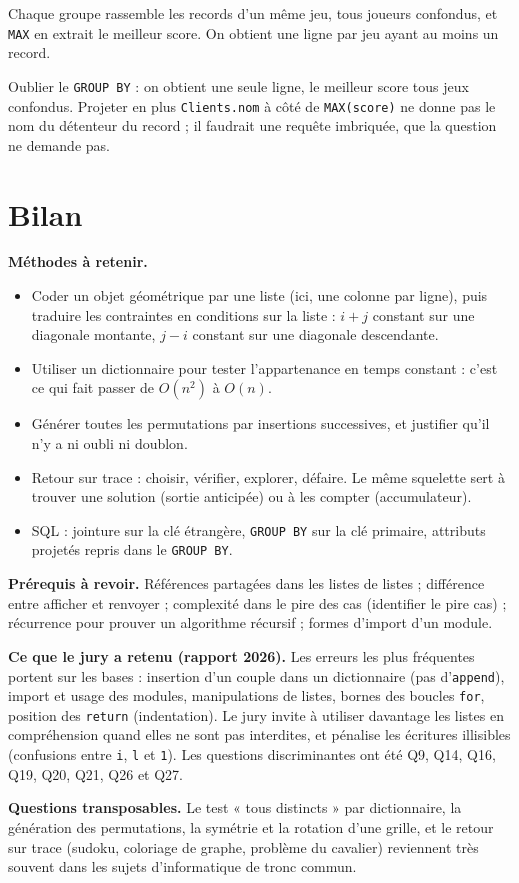 \documentclass[11pt,a4paper]{article}
\providecommand{\tightlist}{\setlength{\itemsep}{0pt}\setlength{\parskip}{0pt}}
\begin{document}
Chaque groupe rassemble les records d'un même jeu, tous joueurs confondus, et \texttt{MAX} en extrait le meilleur score. On obtient une ligne par jeu ayant au moins un record.

\begin{piege}

Oublier le \texttt{GROUP\ BY} : on obtient une seule ligne, le meilleur score tous jeux confondus. Projeter en plus \texttt{Clients.nom} à côté de \texttt{MAX(score)} ne donne pas le nom du détenteur du record ; il faudrait une requête imbriquée, que la question ne demande pas.

\end{piege}

\hypertarget{bilan}{%
\section{Bilan}\label{bilan}}

\textbf{Méthodes à retenir.}

\begin{itemize}
\tightlist
\item
  Coder un objet géométrique par une liste (ici, une colonne par ligne), puis traduire les contraintes en conditions sur la liste : \(i + j\) constant sur une diagonale montante, \(j - i\) constant sur une diagonale descendante.
\item
  Utiliser un dictionnaire pour tester l'appartenance en temps constant : c'est ce qui fait passer de \(O(n^2)\) à \(O(n)\).
\item
  Générer toutes les permutations par insertions successives, et justifier qu'il n'y a ni oubli ni doublon.
\item
  Retour sur trace : choisir, vérifier, explorer, défaire. Le même squelette sert à trouver une solution (sortie anticipée) ou à les compter (accumulateur).
\item
  SQL : jointure sur la clé étrangère, \texttt{GROUP\ BY} sur la clé primaire, attributs projetés repris dans le \texttt{GROUP\ BY}.
\end{itemize}

\textbf{Prérequis à revoir.} Références partagées dans les listes de listes ; différence entre afficher et renvoyer ; complexité dans le pire des cas (identifier le pire cas) ; récurrence pour prouver un algorithme récursif ; formes d'import d'un module.

\textbf{Ce que le jury a retenu (rapport 2026).} Les erreurs les plus fréquentes portent sur les bases : insertion d'un couple dans un dictionnaire (pas d'\texttt{append}), import et usage des modules, manipulations de listes, bornes des boucles \texttt{for}, position des \texttt{return} (indentation). Le jury invite à utiliser davantage les listes en compréhension quand elles ne sont pas interdites, et pénalise les écritures illisibles (confusions entre \texttt{i}, \texttt{l} et \texttt{1}). Les questions discriminantes ont été Q9, Q14, Q16, Q19, Q20, Q21, Q26 et Q27.

\textbf{Questions transposables.} Le test « tous distincts » par dictionnaire, la génération des permutations, la symétrie et la rotation d'une grille, et le retour sur trace (sudoku, coloriage de graphe, problème du cavalier) reviennent très souvent dans les sujets d'informatique de tronc commun.
\end{document}
